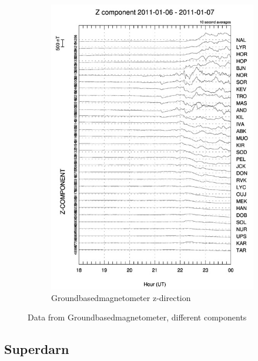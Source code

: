 \documentclass[10pt,a4paper]{article}
\begin{document}
\begin{figure}[h]
\begin{subfigure}{0.3\textwidth}
	\includegraphics[width=\textwidth]{Z_gram.jpg}
	\caption{  Groundbasedmagnetometer z-direction\label{GBM_Z}}
\end{subfigure}
\caption{Data from Groundbasedmagnetometer, different components }
\end{figure}

\clearpage

\subsection{Superdarn}
\end{document}
